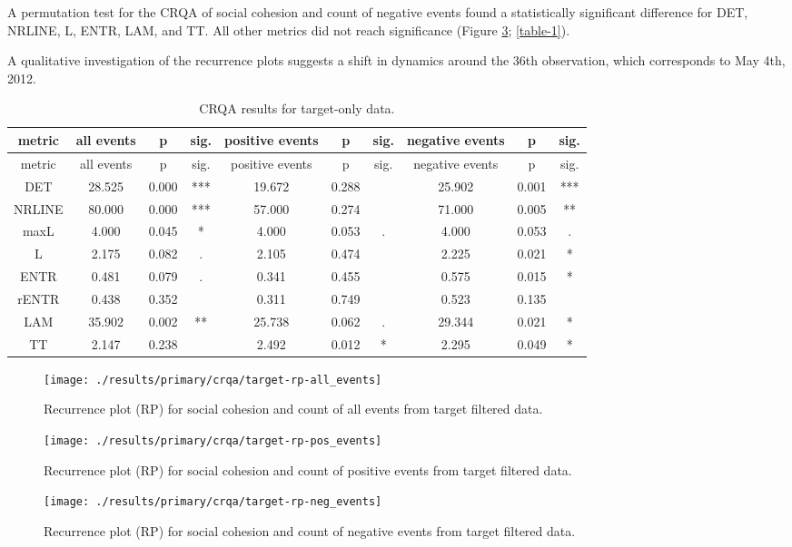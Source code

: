 \documentclass[english,man]{apa6}
\begin{document}
A permutation test for the CRQA of social cohesion and
count of negative events found a statistically significant difference for DET,
NRLINE, L, ENTR, LAM, and TT. All other metrics did not reach significance
(Figure \ref{fig:plot-rp-targ-neg}; \autoref{table-1}).

A qualitative investigation of the recurrence plots suggests
a shift in dynamics around the 36th observation,
which corresponds to May 4th, 2012.

\begin{longtable}[]{@{}cccccccccc@{}}
\caption{\label{table-1}CRQA results for target-only data.}\tabularnewline
\toprule
metric & all events & p & sig. & positive events & p & sig. & negative events & p & sig.\tabularnewline
\midrule
\endfirsthead
\toprule
metric & all events & p & sig. & positive events & p & sig. & negative events & p & sig.\tabularnewline
\midrule
\endhead
DET & 28.525 & 0.000 & *** & 19.672 & 0.288 & & 25.902 & 0.001 & ***\tabularnewline
NRLINE & 80.000 & 0.000 & *** & 57.000 & 0.274 & & 71.000 & 0.005 & **\tabularnewline
maxL & 4.000 & 0.045 & * & 4.000 & 0.053 & . & 4.000 & 0.053 & .\tabularnewline
L & 2.175 & 0.082 & . & 2.105 & 0.474 & & 2.225 & 0.021 & *\tabularnewline
ENTR & 0.481 & 0.079 & . & 0.341 & 0.455 & & 0.575 & 0.015 & *\tabularnewline
rENTR & 0.438 & 0.352 & & 0.311 & 0.749 & & 0.523 & 0.135 &\tabularnewline
LAM & 35.902 & 0.002 & ** & 25.738 & 0.062 & . & 29.344 & 0.021 & *\tabularnewline
TT & 2.147 & 0.238 & & 2.492 & 0.012 & * & 2.295 & 0.049 & *\tabularnewline
\bottomrule
\end{longtable}

\begin{figure}
\texttt{[image: ./results/primary/crqa/target-rp-all\_events]} \caption{Recurrence plot (RP) for social cohesion and count of all events from target filtered data.}\label{fig:plot-rp-targ-all}
\end{figure}

\begin{figure}
\texttt{[image: ./results/primary/crqa/target-rp-pos\_events]} \caption{Recurrence plot (RP) for social cohesion and count of positive events from target filtered data.}\label{fig:plot-rp-targ-pos}
\end{figure}

\begin{figure}
\texttt{[image: ./results/primary/crqa/target-rp-neg\_events]} \caption{Recurrence plot (RP) for social cohesion and count of negative events from target filtered data.}\label{fig:plot-rp-targ-neg}
\end{figure}
\end{document}

